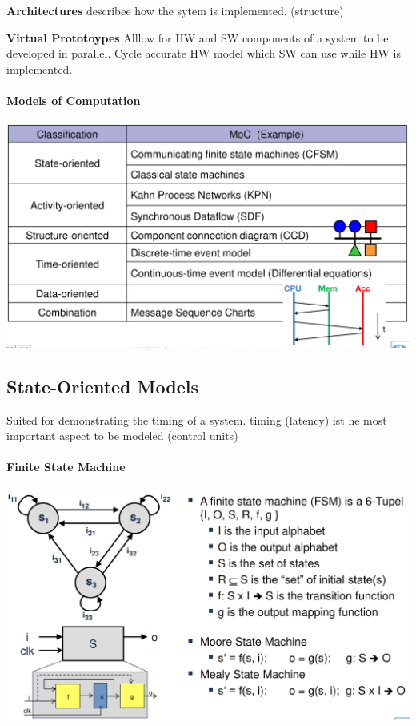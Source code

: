 \documentclass[english]{latex4ei/latex4ei_sheet}
\begin{document}
\textbf{Architectures} describee how the sytem is implemented. (structure)

\textbf{Virtual Prototoypes} Alllow for HW and SW components of a system to be developed in parallel. Cycle accurate HW model which SW can use while HW is implemented.

\paragraph{Models of Computation}

\begin{center}
  \includegraphics[width=0.8\linewidth]{assets/ModelsOfComputation.png}
\end{center}

\subsection{State-Oriented Models}
Suited for demonstrating the timing of a system. timing (latency) ist he most important aspect to be modeled (control units)

\paragraph{Finite State Machine}

\begin{center}
  \includegraphics[width=0.8\linewidth]{assets/FiniteStateMachine.png}
  \label{fig:finitestatemachine}
\end{center}
\end{document}
